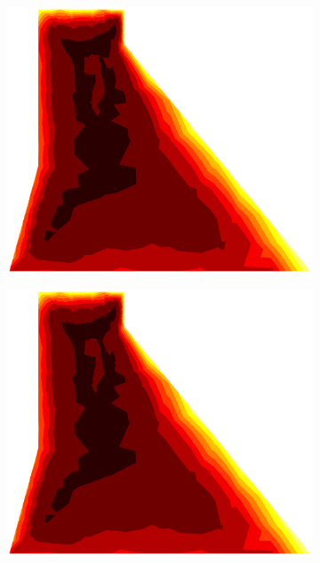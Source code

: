 \documentclass[10pt, a4paper]{article}
\begin{document}
\begin{figure}[H]
\begin{subfigure}[H]{0.19\textwidth}
		\includegraphics[width=1.2\textwidth]{fig/22.eps}
	\end{subfigure}
	\begin{subfigure}[H]{0.19\textwidth}
		\includegraphics[width=1.2\textwidth]{fig/23.eps}
	\end{subfigure}
	\begin{subfigure}[H]{0.19\textwidth}

\end{subfigure}
\end{figure}
\end{document}
